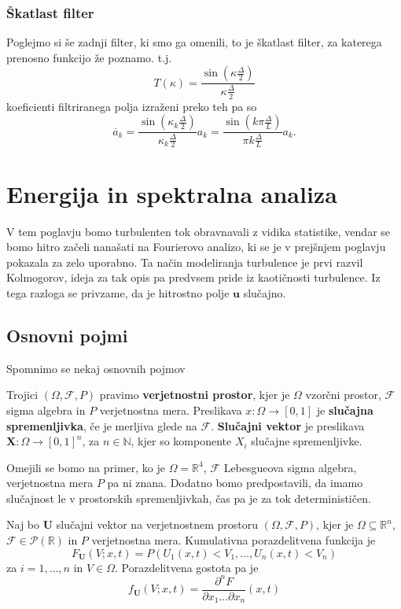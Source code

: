\documentclass[mat2, tisk]{fmfdelo}
\newcommand{\R}{\mathbb R}
\newcommand{\N}{\mathbb N}
\newcommand{\bd}{\textbf}
\begin{document}
\subsubsection{Škatlast filter}
Poglejmo si še zadnji filter, ki smo ga omenili, to je 
škatlast filter, za katerega prenosno funkcijo že poznamo. t.j.
$$
T(\kappa) = \frac{\sin(\kappa \frac{\Delta}{2})}{\kappa \frac{\Delta}{2}}
$$
koeficienti filtriranega polja izraženi preko teh pa so 
$$
\overline{a}_k = \frac{\sin(\kappa_k \frac{\Delta}{2})}{\kappa_k \frac{\Delta}{2}} a_k = \frac{\sin(k\pi\frac{\Delta}{L})}{\pi k\frac{\Delta}{L}} a_k .
$$


\section{Energija in spektralna analiza}

V tem poglavju bomo turbulenten tok obravnavali z vidika statistike, 
vendar se bomo hitro začeli nanašati na Fourierovo analizo, ki 
se je v prejšnjem poglavju pokazala za zelo uporabno. Ta način 
modeliranja turbulence je prvi razvil Kolmogorov, ideja za tak 
opis pa predvsem pride iz kaotičnosti turbulence. Iz tega razloga se 
privzame, da je hitrostno polje $\bd{u}$ slučajno. 

\subsection{Osnovni pojmi}

Spomnimo se nekaj osnovnih pojmov

\begin{definicija}
Trojici $(\Omega, \mathcal{F}, P)$ pravimo \textbf{verjetnostni prostor}, 
kjer je $\Omega$ vzorčni prostor, $\mathcal{F}$ sigma algebra in 
$P$ verjetnostna mera. Preslikava $x: \Omega \rightarrow [0, 1]$ 
je \textbf{slučajna spremenljivka}, če je merljiva glede na $\mathcal{F}$. 
\textbf{Slučajni vektor} je preslikava $\bd{X}: \Omega \rightarrow [0, 1]^n$, 
za $n\in \N$, kjer so komponente $X_i$ slučajne spremenljivke.
\end{definicija}

Omejili  se bomo na primer, ko je $\Omega = \R^4$, $\mathcal{F}$ 
Lebesgueova sigma algebra, verjetnostna mera $P$ pa ni znana. 
Dodatno bomo predpostavili, da imamo slučajnost le v prostorskih 
spremenljivkah, čas pa je za tok determinističen. 

\begin{definicija}
Naj bo $\bd{U}$ slučajni vektor na verjetnostnem prostoru $(\Omega, \mathcal{F}, P)$,
kjer je $\Omega \subseteq \R^n$, $\mathcal{F} \in \mathcal{P}(\R)$ in $P$ verjetnostna mera.
Kumulativna porazdelitvena funkcija je
\begin{equation}
F_\bd{U}(V; x, t) = P(U_1(x, t) < V_1, \dots, U_n(x, t) < V_n)
\end{equation}
za $i = 1, \dots, n$ in $V \in \Omega$. Porazdelitvena 
gostota pa je 
\begin{equation}
f_\bd{U}(V; x, t) = \frac{\partial^n F}{\partial x_1 \dots \partial x_n}(x, t)
\end{equation}
\end{definicija}
\end{document}
